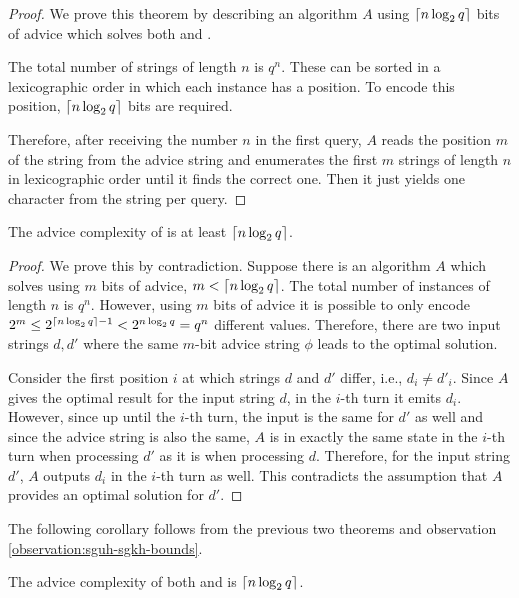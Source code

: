 \begin{proof}
    We prove this theorem by describing an algorithm $A$ using $\lceil n
    \log_2 q\rceil$ bits of advice which solves both  and .

    The total number of strings of length $n$ is $q^n$. These can be
    sorted in a lexicographic order in which each instance has a position.
    To encode this position, $\lceil n \log_2 q\rceil$ bits are required.

    Therefore, after receiving the number $n$ in the first query, $A$
    reads the position $m$ of the string from the advice string and
    enumerates the first $m$ strings of length $n$ in lexicographic order
    until it finds the correct one. Then it just yields one character from
    the string per query.
\end{proof}

\begin{theorem}\label{theorem:sgkh-lower}
    The advice complexity of  is at least $\lceil n \log_2 q\rceil$.
\end{theorem}

\begin{proof}
    We prove this by contradiction. Suppose there is an algorithm $A$
    which solves  using $m$ bits of advice, $m < \lceil n \log_2 q\rceil$.
    The total number of instances of length $n$ is $q^n$. However, using
    $m$ bits of advice it is possible to only encode $2^m \leq 2^{\lceil n
    \log_2 q\rceil - 1} < 2^{n \log_2 q} = q^n$ different values. Therefore, there
    are two input strings $d, d'$ where the same $m$-bit advice string
    $\phi$ leads to the optimal solution.

    Consider the first position $i$ at which strings $d$ and $d'$ differ,
    i.e., $d_i \not= d'_i$. Since $A$ gives the optimal result for the
    input string $d$, in the $i$-th turn it emits $d_i$. However, since up
    until the $i$-th turn, the input is the same for $d'$ as well and
    since the advice string is also the same, $A$ is in exactly the same
    state in the $i$-th turn when processing $d'$ as it is when processing
    $d$. Therefore, for the input string $d'$, $A$ outputs $d_i$ in the
    $i$-th turn as well. This contradicts the assumption that $A$ provides
    an optimal solution for $d'$.
\end{proof}

The following corollary follows from the previous two theorems and
observation \ref{observation:sguh-sgkh-bounds}.

\begin{corollary}
    The advice complexity of both  and  is $\lceil n \log_2
    q\rceil$.
\end{corollary}

